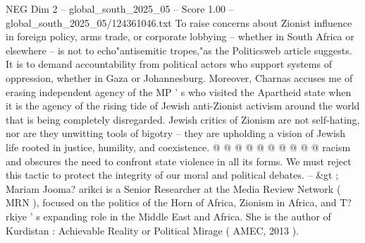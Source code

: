 \begin{textsample}{NEG Dim 2 – global\_south\_2025\_05 – Score 1.00 – global\_south\_2025\_05/124361046.txt}
To raise concerns about Zionist influence in foreign policy, arms trade, or corporate lobbying -- whether in South Africa or elsewhere -- is not to echo"antisemitic tropes,"as the Politicsweb article suggests.
It is to demand accountability from political actors who support systems of oppression, whether in Gaza or Johannesburg.
Moreover, Charnas accuses me of erasing independent agency of the MP ' s who visited the Apartheid state when it is the agency of the rising tide of Jewish anti-Zionist activism around the world that is being completely disregarded.
Jewish critics of Zionism are not self-hating, nor are they unwitting tools of bigotry -- they are upholding a vision of Jewish life rooted in justice, humility, and coexistence. @ @ @ @ @ @ @ @ @ @ racism and obscures the need to confront state violence in all its forms.
We must reject this tactic to protect the integrity of our moral and political debates. -- \&gt ; Mariam Jooma? arikci is a Senior Researcher at the Media Review Network ( MRN ), focused on the politics of the Horn of Africa, Zionism in Africa, and T? rkiye ' s expanding role in the Middle East and Africa.
She is the author of Kurdistan : Achievable Reality or Political Mirage ( AMEC, 2013 ).

\end{textsample}
